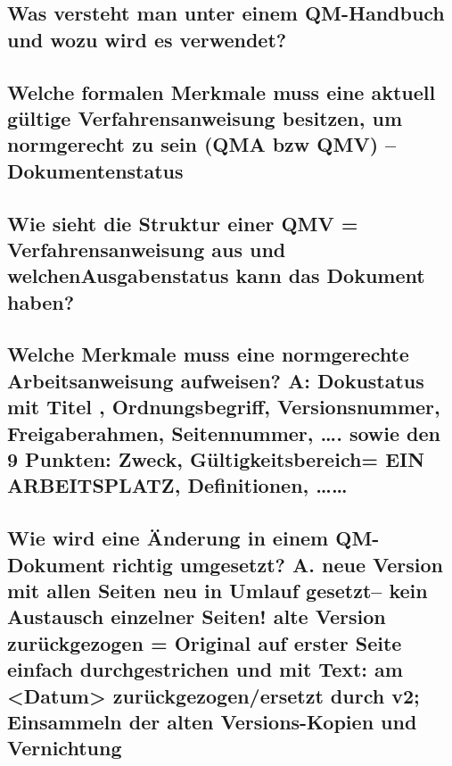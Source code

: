	\subsection{Was versteht man unter einem QM-Handbuch und wozu wird es verwendet?}
	
	\subsection{Welche formalen Merkmale muss eine aktuell gültige Verfahrensanweisung besitzen, um normgerecht zu sein (QMA bzw QMV) – Dokumentenstatus}
	
	\subsection{Wie sieht die Struktur einer QMV = Verfahrensanweisung aus und welchenAusgabenstatus kann das Dokument haben?}
	
	\subsection{Welche Merkmale muss eine normgerechte Arbeitsanweisung aufweisen? A: Dokustatus mit Titel , Ordnungsbegriff, Versionsnummer, Freigaberahmen, Seitennummer, ….  sowie den 9 Punkten: Zweck, Gültigkeitsbereich= EIN ARBEITSPLATZ, Definitionen, ……}
	
	\subsection{Wie wird eine Änderung in einem QM-Dokument  richtig umgesetzt?
	A. neue Version mit allen Seiten neu in Umlauf gesetzt– kein Austausch einzelner Seiten! alte Version zurückgezogen = Original auf erster Seite einfach durchgestrichen und mit Text: am <Datum> zurückgezogen/ersetzt durch v2; Einsammeln der alten Versions-Kopien und Vernichtung}

